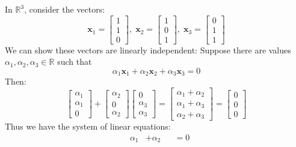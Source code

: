 \begin{example} In $\mathbb{R}^3$, consider the vectors:
\begin{displaymath}
\mathbf{x}_1 = \begin{bmatrix}
1\\1\\0
\end{bmatrix},\;
\mathbf{x}_2 = \begin{bmatrix}
1\\0\\1
\end{bmatrix},\;
\mathbf{x}_3 = \begin{bmatrix}
0\\1\\1
\end{bmatrix}
\end{displaymath}
We can show these vectors are linearly independent: Suppose there are values $\alpha_1, \alpha_2, \alpha_3\in \mathbb{R}$ such that 
\begin{displaymath}
\alpha_1\mathbf{x}_1 + \alpha_2\mathbf{x}_2 + \alpha_3\mathbf{x}_3 = 0
\end{displaymath}
Then:
\begin{displaymath}
\begin{bmatrix}
\alpha_1\\\alpha_1\\0 
\end{bmatrix} + 
\begin{bmatrix}
\alpha_2\\0\\ \alpha_2
\end{bmatrix}
\begin{bmatrix}
0\\\alpha_3\\ \alpha_3
\end{bmatrix} = 
\begin{bmatrix}
\alpha_1+\alpha_2\\
\alpha_1 + \alpha_3 \\
\alpha_2 + \alpha_3
\end{bmatrix}=
\begin{bmatrix}
0\\0\\0
\end{bmatrix}
\end{displaymath}
Thus we have the system of linear equations:
\begin{displaymath}
\begin{aligned}
&\alpha_1  &+\alpha_2 &&= 0\\

\end{aligned}
\end{displaymath}
\end{example}
